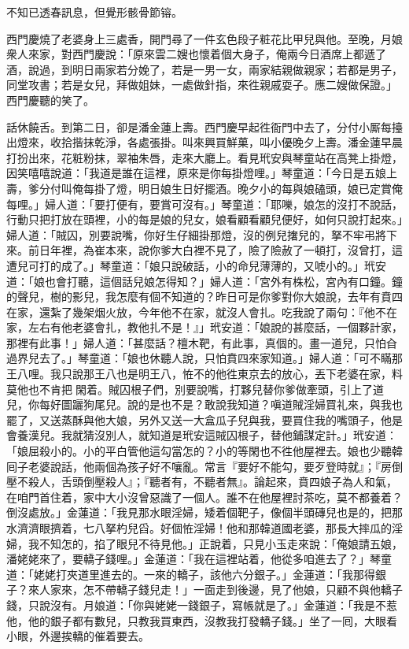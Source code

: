 \begin{myquote}
不知已透春訊息，但覺形骸骨節镕。
\end{myquote}

西門慶燒了老婆身上三處香，開門尋了一件玄色段子粧花比甲兒與他。至晚，月娘衆人來家，對西門慶說：「原來雲二嫂也懷着個大身子，俺兩今日酒席上都遞了酒，說過，到明日兩家若分娩了，若是一男一女，兩家結親做親家；若都是男子，同堂攻書；若是女兒，拜做姐妹，一處做針指，來徃親戚耍子。應二嫂做保證。」西門慶聽的笑了。

話休饒舌。到第二日，卻是潘金蓮上壽。西門慶早起徃衙門中去了，分付小厮每擡出燈來，收拾揩抹乾淨，各處張掛。叫來興買鮮菓，叫小優晚夕上壽。潘金蓮早晨打扮出來，花粧粉抹，翠袖朱唇，走來大廳上。看見玳安與琴童站在高凳上掛燈，因笑嘻嘻說道：「我道是誰在這裡，原來是你每掛燈哩。」琴童道：「今日是五娘上壽，爹分付叫俺每掛了燈，明日娘生日好擺酒。晚夕小的每與娘磕頭，娘已定賞俺每哩。」婦人道：「要打便有，要賞可沒有。」琴童道：「耶嚛，娘怎的沒打不說話，行動只把打放在頭裡，小的每是娘的兒女，娘看顧看顧兒便好，如何只說打起來。」婦人道：「賊囚，別要說嘴，你好生仔細掛那燈，沒的例兒撦兒的，拏不牢弔將下來。前日年裡，為崔本來，說你爹大白裡不見了，險了險赦了一頓打，沒曾打，這遭兒可打的成了。」琴童道：「娘只說破話，小的命兒薄薄的，又唬小的。」{}玳安道：「娘也會打聽，這個話兒娘怎得知？」婦人道：「宮外有株松，宮內有口鐘。鐘的聲兒，樹的影兒，我怎麼有個不知道的？昨日可是你爹對你大娘說，去年有賁四在家，還紮了幾架烟火放，今年他不在家，就沒人會扎。吃我說了兩句：『他不在家，左右有他老婆會扎，教他扎不是！』」{}玳安道：「娘說的甚麼話，一個夥計家，那裡有此事！」婦人道：「甚麼話？檀木靶，有此事，真個的。畫一道兒，只怕㒲過界兒去了。」琴童道：「娘也休聽人說，只怕賁四來家知道。」婦人道：「可不瞞那王八哩。我只說那王八也是明王八，恠不的他徃東京去的放心，丟下老婆在家，料莫他也不肯把𣭈閑着。賊囚根子們，別要說嘴，打夥兒替你爹做牽頭，引上了道兒，你每好圖躧狗尾兒。說的是也不是？敢說我知道？嗔道賊淫婦買礼來，與我也罷了，又送蒸酥與他大娘，另外又送一大盒瓜子兒與我，要買住我的嘴頭子，他是會養漢兒。我就猜沒別人，就知道是玳安這賊囚根子，替他鋪謀定計。」玳安道：「娘屈殺小的。小的平白管他這勾當怎的？小的等閑也不徃他屋裡去。娘也少聽韓囘子老婆說話，他兩個為孩子好不嚷亂。常言『要好不能勾，要歹登時就』；『房倒壓不殺人，舌頭倒壓殺人』；『聽者有，不聽者無』。論起來，賁四娘子為人和氣，在咱門首住着，家中大小沒曾惡識了一個人。誰不在他屋裡討茶吃，莫不都養着？倒沒處放。」金蓮道：「我見那水眼淫婦，矮着個靶子，像個半頭磚兒也是的，把那水濟濟眼擠着，七八拏杓兒舀。好個恠淫婦！他和那韓道國老婆，那長大摔瓜的淫婦，我不知怎的，掐了眼兒不待見他。」{}正說着，只見小玉走來說：「俺娘請五娘，潘姥姥來了，要轎子錢哩。」金蓮道：「我在這裡站着，他從多咱進去了？」琴童道：「姥姥打夾道里進去的。一來的轎子，該他六分銀子。」金蓮道：「我那得銀子？來人家來，怎不帶轎子錢兒走！」一面走到後邊，見了他娘，只顧不與他轎子錢，只說沒有。{}月娘道：「你與姥姥一錢銀子，寫帳就是了。」金蓮道：「我是不惹他，他的銀子都有數兒，只教我買東西，沒教我打發轎子錢。」坐了一囘，大眼看小眼，外邊挨轎的催着要去。

